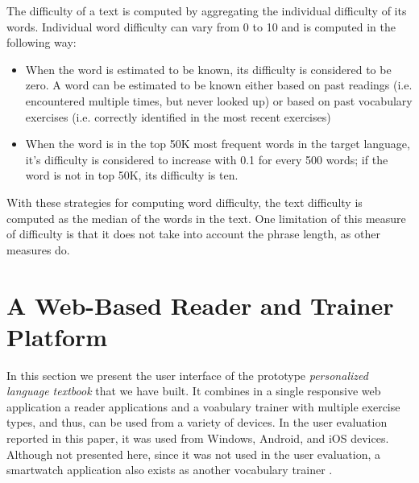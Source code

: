 The difficulty of a text is computed by aggregating the individual difficulty of its words. Individual word difficulty can vary from 0 to 10 and is computed in the following way: 

\begin{itemize}
	\item When the word is estimated to be known, its difficulty is considered to be zero. A word can be estimated to be known either based on past readings (i.e. encountered multiple times, but never looked up) or based on past vocabulary exercises (i.e. correctly identified in the most recent exercises) 
	\item When the word is in the top 50K most frequent words in the target language, it's difficulty is 	considered to increase with 0.1 for every 500 words; if the word is not in top 50K, its difficulty is ten.
\end{itemize}

With these strategies for computing word difficulty, the text difficulty is computed as the median of the words in the text. One limitation of this measure of difficulty is that it does not take into account the phrase length, as other measures do. \cite{Kincaid75-Readability}


\newpage
\section{A Web-Based Reader and Trainer Platform}


	
	In this section we present the user interface of the prototype {\em personalized language textbook} that we have built. It combines in a single responsive web application a reader applications and a voabulary trainer with multiple exercise types, and thus, can be used from a variety of devices. In the user evaluation reported in this paper, it was used from Windows, Android, and iOS devices. Although not presented here, since it was not used in the user evaluation, a smartwatch application also exists as another vocabulary trainer \cite{Nien16-time}.


